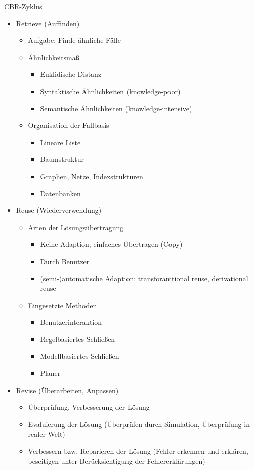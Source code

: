 \documentclass[paper=a4, fontsize=11pt]{scrartcl} %
\numberwithin{equation}{section} %
\numberwithin{figure}{section} %
\numberwithin{table}{section} %
\begin{document}
CBR-Zyklus
\begin{itemize}
\item Retrieve (Auffinden)
\begin{itemize}
\item Aufgabe: Finde ähnliche Fälle
\item Ähnlichkeitsmaß
\begin{itemize}
\item Euklidische Distanz
\item Syntaktische Ähnlichkeiten (knowledge-poor)
\item Semantische Ähnlichkeiten (knowledge-intensive)
\end{itemize}
\item Organisation der Fallbasis
\begin{itemize}
\item Lineare Liste
\item Baumstruktur
\item Graphen, Netze, Indexstrukturen
\item Datenbanken
\end{itemize}
\end{itemize}
\item Reuse (Wiederverwendung)
\begin{itemize}
\item Arten der Lösungsübertragung
\begin{itemize}
\item Keine Adaption, einfaches Übertragen (Copy)
\item Durch Benutzer
\item (semi-)automatische Adaption: transforamtional reuse, derivational reuse
\end{itemize}
\item Eingesetzte Methoden
\begin{itemize}
\item Benutzerinteraktion
\item Regelbasiertes Schließen
\item Modellbasiertes Schließen
\item Planer
\end{itemize}
\end{itemize}
\item Revise (Überarbeiten, Anpassen)
\begin{itemize}
\item Überprüfung, Verbesserung der Lösung
\item Evaluierung der Lösung (Überprüfen durch Simulation, Überprüfung in realer Welt)
\item Verbessern bzw. Reparieren der Lösung (Fehler erkennen und erklären, beseitigen unter Berücksichtigung der Fehlererklärungen)

\end{itemize}
\end{itemize}
\end{document}
